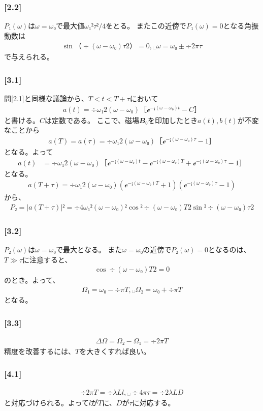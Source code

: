 \documentclass[\main/main.tex]{subfiles}
\begin{document}
\subsubsection*{
  [2.2]
}
$P₁(ω)$は$ω = ω₀$で最大値$ω₁²τ²/4$をとる。
またこの近傍で$P₁(ω)=0$となる角振動数は
\begin{align}
  \sin（÷{(ω-ω₀)τ}{2}） = 0,␣ ω = ω₀ ± ÷{2𝜋}{τ}
\end{align}
で与えられる。
\subsubsection*{
  [3.1]
}
問[2.1]と同様な議論から、$T < t < T+τ$において
\begin{align}
  a(t) = ÷{ω₁}{2(ω-ω₀)}［ℯ^{-¡(ω-ω₀)t}-C］
\end{align}
と書ける。$C$は定数である。
ここで、磁場$𝑩₀$を印加したとき$a(t),b(t)$が不変なことから
\begin{align}
  a(T) = a(τ) = ÷{ω₁}{2(ω-ω₀)}［ℯ^{-¡(ω-ω₀)τ}-1］
\end{align}
となる。よって
\begin{align}
  a(t) &
  = ÷{ω₁}{2(ω-ω₀)}［
    ℯ^{-¡(ω-ω₀)t}-ℯ^{-¡(ω-ω₀)T}+ℯ^{-¡(ω-ω₀)τ}-1
  ］
\end{align}
となる。
\begin{align}
  a(T+τ) = ÷{ω₁}{2(ω-ω₀)}(ℯ^{-¡(ω-ω₀)T}+1)(ℯ^{-¡(ω-ω₀)τ}-1)
\end{align}
から、
\begin{align}
  P₂ = |a(T+τ)|²
  = ÷{4ω₁²}{(ω-ω₀)²}\cos²÷{(ω-ω₀)T}{2}\sin²÷{(ω-ω₀)τ}{2}
\end{align}
\subsubsection*{
  [3.2]
}
$P₂(ω)$は$ω=ω₀$で最大となる。
また$ω=ω₀$の近傍で$P₂(ω)=0$となるのは、$T ≫ τ$に注意すると、
\begin{align}
  \cos÷{(ω-ω₀)T}{2} = 0
\end{align}
のとき。よって、
\begin{align}
  Ω₁ = ω₀-÷{𝜋}{T},␣
  Ω₂ = ω₀+÷{𝜋}{T}
\end{align}
となる。
\subsubsection*{
  [3.3]
}
\begin{align}
  𝛥Ω = Ω₂ - Ω₁ = ÷{2𝜋}{T}
\end{align}
精度を改善するには、$T$を大きくすれば良い。
\subsubsection*{
  [4.1]
}
\begin{align}
  ÷{2𝜋}{T} = ÷{λL}{l},␣
  ÷{4𝜋}{τ} = ÷{2λL}{D}
\end{align}
と対応づけられる。よって$l$が$T$に、$D$が$τ$に対応する。
\end{document}
